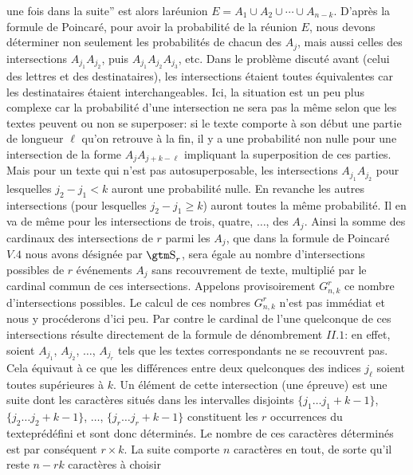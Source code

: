 une fois dans la suite'' est alors lar\'eunion $E = A_1 \cup A_2 \cup
\cdots \cup A_{n-k}$. 
\medskip
D'apr\`es la formule de Poincar\'e,  pour avoir la probabilit\'e de la 
r\'eunion $E$,  nous devons d\'eterminer non seulement les probabilit\'es
de chacun des $A_j$,  mais aussi celles des intersections $A_{j_1}
A_{j_2}$,  puis $A_{j_1} A_{j_2} A_{j_3}$, etc.
\medskip
Dans le probl\`eme discut\'e avant (celui des lettres et des destinataires),
les intersections \'etaient toutes \'equivalentes car les destinataires 
\'etaient interchangeables.  Ici,  la situation est un peu plus complexe
car la probabilit\'e d'une intersection ne sera pas la m\^eme selon que les
textes peuvent ou non se superposer:  si le texte comporte \`a son d\'ebut
une partie de longueur $\ell$ qu'on retrouve \`a la fin,  il y a une 
probabilit\'e non nulle pour une intersection de la forme $A_{j} A_{j + k - 
\ell }$ impliquant la superposition de ces parties.  Mais pour un texte
qui n'est pas autosuperposable,  les intersections $A_{j_1} A_{j_2}$
pour lesquelles $j_2 - j_1 < k$ auront une probabilit\'e nulle.  En
revanche les autres intersections (pour lesquelles $j_2 - j_1 \geq k$)
auront toutes la m\^eme probabilit\'e.  Il en va de m\^eme pour les
intersections de trois, quatre, $\ldots$, des $A_j$.
\medskip
Ainsi la somme des cardinaux des intersections de $r$ parmi 
les $A_j$,  que dans la formule de Poincar\'e $V.4$ nous avons d\'esign\'ee 
par $\som_r$,  sera \'egale au nombre d'intersections possibles de 
$r$ \'ev\'enements $A_j$ sans recouvrement de texte,  multipli\'e par le
cardinal commun de ces intersections.  Appelons provisoirement 
$G_{n,k}^r$ ce nombre d'intersections possibles.  Le calcul de ces
nombres $G_{n,k}^r$ n'est pas imm\'ediat et nous y proc\'ederons d'ici
peu.  Par contre le cardinal de l'une quelconque de ces intersections
r\'esulte directement de la formule de d\'enombrement $II.1$:  en effet,
soient $A_{j_1}$, $A_{j_2}$, $\ldots$, $A_{j_r}$ tels que les textes
correspondants ne se recouvrent pas.  Cela \'equivaut \`a ce que les
diff\'erences entre deux quelconques des indices $j_\ell$ soient toutes
sup\'erieures \`a $k$.  Un \'el\'ement de cette intersection (une \'epreuve)
est une suite dont les caract\`eres situ\'es dans les intervalles disjoints
$\{ j_1 \ldots j_1 + k - 1 \}$, $\{ j_2 \ldots j_2 + k - 1 \}$, $\ldots$, 
$\{ j_r
\ldots j_r + k - 1 \}$ constituent les $r$ occurrences du textepr\'ed\'efini
et sont donc d\'etermin\'es.  Le nombre de ces caract\`eres
d\'etermin\'es est par cons\'equent $r \times k$.  La suite comporte $n$
caract\`eres en tout,  de sorte qu'il reste $n - rk$ caract\`eres \`a choisir
